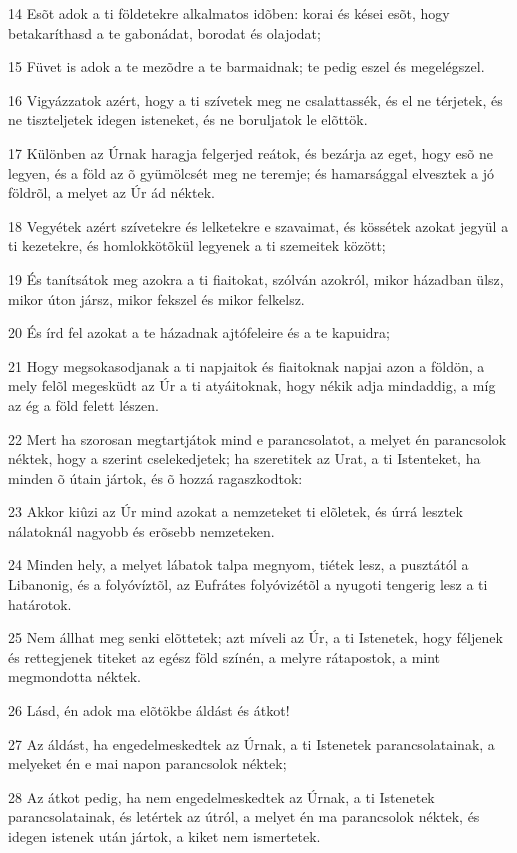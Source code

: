 \par 14 Esõt adok a ti földetekre alkalmatos idõben: korai és kései esõt, hogy betakaríthasd a te gabonádat, borodat és olajodat;
\par 15 Füvet is adok a te mezõdre a te barmaidnak; te pedig eszel és megelégszel.
\par 16 Vigyázzatok azért, hogy a ti szívetek meg ne csalattassék, és el ne térjetek, és ne tiszteljetek idegen isteneket, és ne boruljatok le elõttök.
\par 17 Különben az Úrnak haragja felgerjed reátok, és bezárja az eget, hogy esõ ne legyen, és a föld az õ gyümölcsét meg ne teremje; és hamarsággal elvesztek a jó földrõl, a melyet az Úr ád néktek.
\par 18 Vegyétek azért szívetekre és lelketekre e szavaimat, és kössétek azokat jegyül a ti kezetekre, és homlokkötõkül legyenek a ti szemeitek között;
\par 19 És tanítsátok meg azokra a ti fiaitokat, szólván azokról, mikor házadban ülsz, mikor úton jársz, mikor fekszel és mikor felkelsz.
\par 20 És írd fel azokat a te házadnak ajtófeleire és a te kapuidra;
\par 21 Hogy megsokasodjanak a ti napjaitok és fiaitoknak napjai azon a földön, a mely felõl megesküdt az Úr a ti atyáitoknak, hogy nékik adja mindaddig, a míg az ég a föld felett lészen.
\par 22 Mert ha szorosan megtartjátok mind e parancsolatot, a melyet én parancsolok néktek, hogy a szerint cselekedjetek; ha szeretitek az Urat, a ti Istenteket, ha minden õ útain jártok, és õ hozzá ragaszkodtok:
\par 23 Akkor kiûzi az Úr mind azokat a nemzeteket ti elõletek, és úrrá lesztek nálatoknál nagyobb és erõsebb nemzeteken.
\par 24 Minden hely, a melyet lábatok talpa megnyom, tiétek lesz, a pusztától a Libanonig, és a folyóvíztõl, az Eufrátes folyóvizétõl a nyugoti tengerig lesz a ti határotok.
\par 25 Nem állhat meg senki elõttetek; azt míveli az Úr, a ti Istenetek, hogy féljenek és rettegjenek titeket az egész föld színén, a melyre rátapostok, a mint megmondotta néktek.
\par 26 Lásd, én adok ma elõtökbe áldást és átkot!
\par 27 Az áldást, ha engedelmeskedtek az Úrnak, a ti Istenetek parancsolatainak, a melyeket én e mai napon parancsolok néktek;
\par 28 Az átkot pedig, ha nem engedelmeskedtek az Úrnak, a ti Istenetek parancsolatainak, és letértek az útról, a melyet én ma parancsolok néktek, és idegen istenek után jártok, a kiket nem ismertetek.
